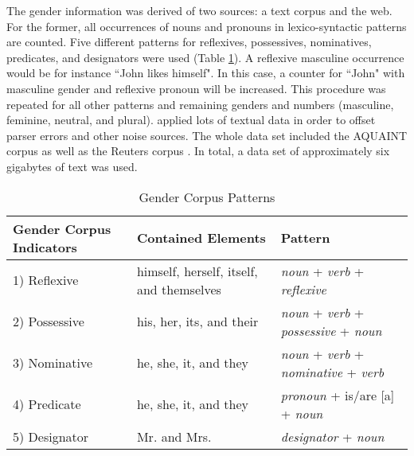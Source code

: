 The gender information was derived of two sources: a text corpus and the web. 
For the former, all occurrences of nouns and pronouns in lexico-syntactic patterns are counted. Five different patterns for reflexives, possessives, nominatives, predicates, and designators were used (Table \ref{table:bergsma2004GenderTable}). A reflexive masculine occurrence would be for instance “John likes himself". In this case, a counter for “John" with masculine gender and reflexive pronoun will be increased. This procedure was repeated for all other patterns and remaining genders and numbers (masculine, feminine, neutral, and plural). \cite{bergsma2005automatic} applied lots of textual data in order to offset parser errors and other noise sources. The whole data set included the AQUAINT corpus \citep{graff2002aquaint} as well as the Reuters corpus \citep{rose2002reuters}. In total, a data set of approximately six gigabytes of text was used.

\begin{table}[h]
    \begin{tabular}{| l | p{5cm} | p{5cm} |}
    \hline
    Gender Corpus Indicators & Contained Elements & Pattern \\ \hline
\hline
    1) Reflexive & himself, herself, itself, and themselves &  \textit{noun} + \textit{verb} + \textit{reflexive}\\ \hline
    2) Possessive & his, her, its, and their & \textit{noun} + \textit{verb} + \textit{possessive} + \textit{noun} \\ \hline
    3) Nominative & he, she, it, and they & \textit{noun} + \textit{verb} + \textit{nominative} +  \textit{verb} \\ \hline
    4) Predicate & he, she, it, and they & \textit{pronoun} + is/are [a] + \textit{noun}  \\ \hline
    5) Designator & Mr. and Mrs. & \textit{designator} + \textit{noun}\\ \hline
    \end{tabular}
  \caption{Gender Corpus Patterns}
     \label{table:bergsma2004GenderTable}
\end{table}


